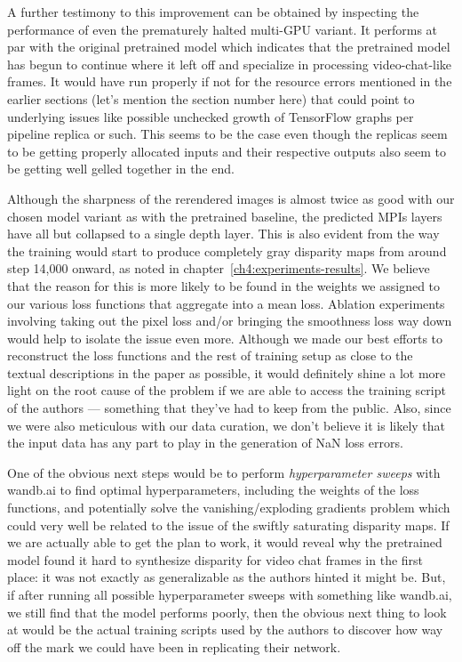 A further testimony to this improvement can be obtained by inspecting the performance of even the prematurely halted multi-GPU variant. It performs at par with the original pretrained model which indicates that the pretrained model has begun to continue where it left off and specialize in processing video-chat-like frames. It would have run properly if not for the resource errors mentioned in the earlier sections (let's mention the section number here) that could point to underlying issues like possible unchecked growth of TensorFlow graphs per pipeline replica or such. This seems to be the case even though the replicas seem to be getting properly allocated inputs and their respective outputs also seem to be getting well gelled together in the end.

Although the sharpness of the rerendered images is almost twice as good with our chosen model variant as with the pretrained baseline, the predicted MPIs layers have all but collapsed to a single depth layer. This is also evident from the way the training would start to produce completely gray disparity maps from around step 14,000 onward, as noted in chapter~\ref{ch4:experiments-results}. We believe that the reason for this is more likely to be found in the weights we assigned to our various loss functions that aggregate into a mean loss. Ablation experiments involving taking out the pixel loss and/or bringing the smoothness loss way down would help to isolate the issue even more. Although we made our best efforts to reconstruct the loss functions and the rest of training setup as close to the textual descriptions in the paper as possible, it would definitely shine a lot more light on the root cause of the problem if we are able to access the training script of the authors --- something that they've had to keep from the public. Also, since we were also meticulous with our data curation, we don't believe it is likely that the input data has any part to play in the generation of NaN loss errors.

One of the obvious next steps would be to perform \textit{hyperparameter sweeps} with wandb.ai to find optimal hyperparameters, including the weights of the loss functions, and potentially solve the vanishing/exploding gradients problem which could very well be related to the issue of the swiftly saturating disparity maps. If we are actually able to get the plan to work, it would reveal why the pretrained model found it hard to synthesize disparity for video chat frames in the first place: it was not exactly as generalizable as the authors hinted it might be. But, if after running all possible hyperparameter sweeps with something like wandb.ai, we still find that the model performs poorly, then the obvious next thing to look at would be the actual training scripts used by the authors to discover how way off the mark we could have been in replicating their network.


